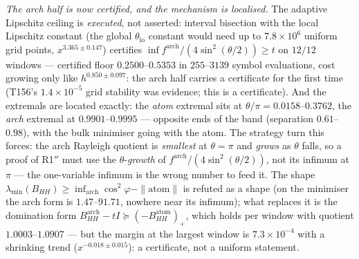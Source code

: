 \documentclass[11pt,a4paper]{article}
\begin{document}
\emph{The arch half is now certified, and the mechanism is localised.} The adaptive
Lipschitz ceiling is \emph{executed}, not asserted: interval bisection with the local
Lipschitz constant (the global $\theta_{\mathrm{lo}}$ constant would need up to
$7.8\times10^{6}$ uniform grid points, $x^{3.365\pm0.147}$) certifies
$\inf f^{\mathrm{arch}}/(4\sin^2(\theta/2))\ge t$ on $12/12$ windows --- certified floor
$0.2500$--$0.5353$ in $255$--$3139$ symbol evaluations, cost growing only like
$h^{0.850\pm0.097}$: the arch half carries a certificate for the first time
(T156's $1.4\times10^{-5}$ grid stability was evidence; this is a certificate). And the
extremals are located exactly: the \emph{atom} extremal sits at
$\theta/\pi=0.0158$--$0.3762$, the \emph{arch} extremal at $0.9901$--$0.9995$ ---
opposite ends of the band (separation $0.61$--$0.98$), with the bulk minimiser going
with the atom. The strategy turn this forces: the arch Rayleigh quotient is
\emph{smallest} at $\theta=\pi$ and \emph{grows} as $\theta$ falls, so a proof of
R1$''$ must use the $\theta$-\emph{growth} of $f^{\mathrm{arch}}/(4\sin^2(\theta/2))$,
not its infimum at $\pi$ --- the one-variable infimum is the wrong number to feed it.
The shape $\lambda_{\min}(B_{HH})\ge\inf_{\mathrm{arch}}\cos^2\varphi-\|\mathrm{atom}\|$
is refuted as a shape (on the minimiser the arch form is $1.47$--$91.71$, nowhere near
its infimum); what replaces it is the domination form $B^{\mathrm{arch}}_{HH}-tI\succeq
(-B^{\mathrm{atom}}_{HH})_+$, which holds per window with quotient $1.0003$--$1.0907$
--- but the margin at the largest window is $7.3\times10^{-4}$ with a shrinking trend
($x^{-0.018\pm0.015}$): a certificate, not a uniform statement.
\end{document}
